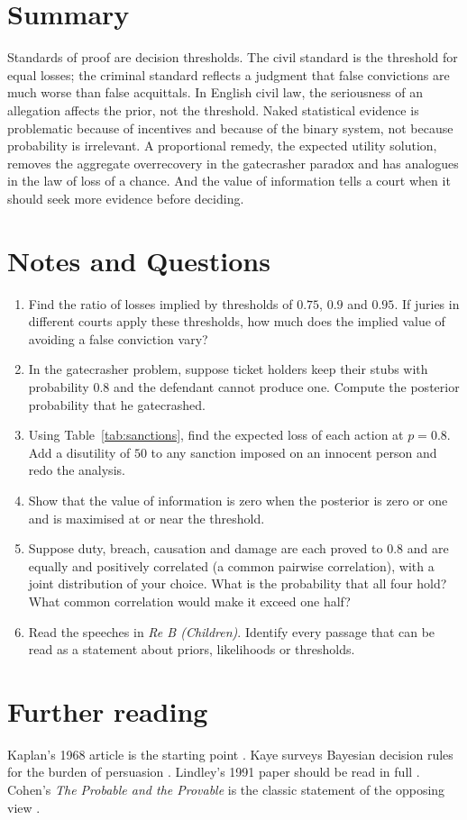 \section{Summary}

Standards of proof are decision thresholds. The civil standard is the threshold for equal losses; the criminal standard reflects a judgment that false convictions are much worse than false acquittals. In English civil law, the seriousness of an allegation affects the prior, not the threshold. Naked statistical evidence is problematic because of incentives and because of the binary system, not because probability is irrelevant. A proportional remedy, the expected utility solution, removes the aggregate overrecovery in the gatecrasher paradox and has analogues in the law of loss of a chance. And the value of information tells a court when it should seek more evidence before deciding.

\section*{Notes and Questions}
\begin{enumerate}[label=\arabic*.]
\item Find the ratio of losses implied by thresholds of $0.75$, $0.9$ and $0.95$. If juries in different courts apply these thresholds, how much does the implied value of avoiding a false conviction vary?
\item In the gatecrasher problem, suppose ticket holders keep their stubs with probability $0.8$ and the defendant cannot produce one. Compute the posterior probability that he gatecrashed.
\item Using Table~\ref{tab:sanctions}, find the expected loss of each action at $p = 0.8$. Add a disutility of $50$ to any sanction imposed on an innocent person and redo the analysis.
\item Show that the value of information is zero when the posterior is zero or one and is maximised at or near the threshold.
\item Suppose duty, breach, causation and damage are each proved to $0.8$ and are equally and positively correlated (a common pairwise correlation), with a joint distribution of your choice. What is the probability that all four hold? What common correlation would make it exceed one half?
\item Read the speeches in \emph{Re B (Children)}. Identify every passage that can be read as a statement about priors, likelihoods or thresholds.
\end{enumerate}

\section*{Further reading}
Kaplan's 1968 article is the starting point \citep{kaplan1968}. Kaye surveys Bayesian decision rules for the burden of persuasion \citep{kaye1999}. Lindley's 1991 paper should be read in full \citep{lindley1991}. Cohen's \emph{The Probable and the Provable} is the classic statement of the opposing view \citep{cohen1977}.
